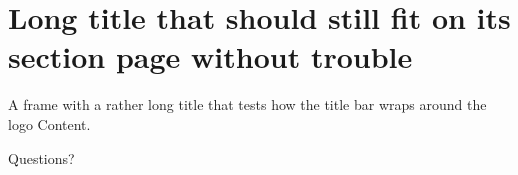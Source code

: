 \section{Long title that should still fit on its section page without trouble}

\begin{frame}{A frame with a rather long title that tests how the title bar wraps around the logo}
	Content.
\end{frame}

\begin{frame}[standout]{Questions?}
\end{frame}


